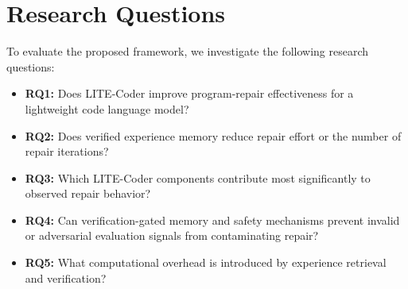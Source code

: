 \section{Research Questions}
To evaluate the proposed framework, we investigate the following research questions:
\begin{itemize}
    \item \textbf{RQ1:} Does LITE-Coder improve program-repair effectiveness for a lightweight code language model?
    \item \textbf{RQ2:} Does verified experience memory reduce repair effort or the number of repair iterations?
    \item \textbf{RQ3:} Which LITE-Coder components contribute most significantly to observed repair behavior?
    \item \textbf{RQ4:} Can verification-gated memory and safety mechanisms prevent invalid or adversarial evaluation signals from contaminating repair?
    \item \textbf{RQ5:} What computational overhead is introduced by experience retrieval and verification?
\end{itemize}
